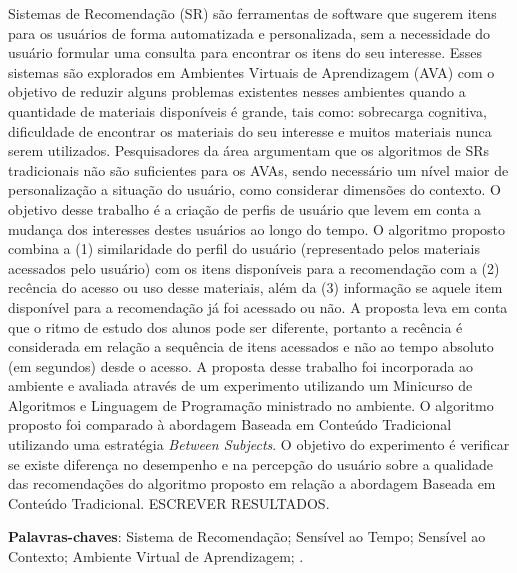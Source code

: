 \begin{resumo}
  Sistemas de Recomendação (SR) são ferramentas de software que sugerem itens para os usuários de forma automatizada e personalizada,
  sem a necessidade do usuário formular uma consulta para encontrar os itens do seu interesse. Esses sistemas são
  explorados em Ambientes Virtuais de Aprendizagem (AVA) com o objetivo de reduzir alguns problemas existentes nesses ambientes
  quando a quantidade de materiais disponíveis é grande, tais como: sobrecarga cognitiva, dificuldade de encontrar os materiais
  do seu interesse e muitos materiais nunca serem utilizados. Pesquisadores da área argumentam que os algoritmos de SRs tradicionais não são suficientes para os AVAs,
  sendo necessário um nível maior de personalização a situação do usuário, como considerar dimensões do contexto. O objetivo
  desse trabalho é a criação de perfis de usuário que levem em conta a mudança dos interesses destes usuários
  ao longo do tempo. O algoritmo proposto combina a (1) similaridade do perfil do usuário (representado
  pelos materiais acessados pelo usuário) com os itens disponíveis para a recomendação com a (2) recência do acesso ou uso
  desse materiais, além da (3) informação se aquele item disponível para a recomendação já foi acessado ou não. A
  proposta leva em conta que o ritmo de estudo dos alunos pode ser diferente, portanto a recência é considerada em relação
  a sequência de itens acessados e não ao tempo absoluto (em segundos) desde o acesso. A proposta desse trabalho foi
  incorporada ao ambiente \adaptwebspace e avaliada através de um experimento utilizando um Minicurso de Algoritmos e Linguagem de Programação
  ministrado no ambiente. O algoritmo proposto foi comparado à abordagem Baseada em Conteúdo Tradicional utilizando uma
  estratégia \textit{Between Subjects}. O objetivo do experimento é verificar se existe diferença no desempenho e na
  percepção do usuário sobre a qualidade das recomendações do algoritmo proposto em relação a abordagem Baseada em
  Conteúdo Tradicional. ESCREVER RESULTADOS.

  \vspace{\onelineskip}

  \noindent
  \textbf{Palavras-chaves}: Sistema de Recomendação; Sensível ao Tempo; Sensível ao Contexto; Ambiente Virtual de Aprendizagem; \adaptweb.
\end{resumo}

